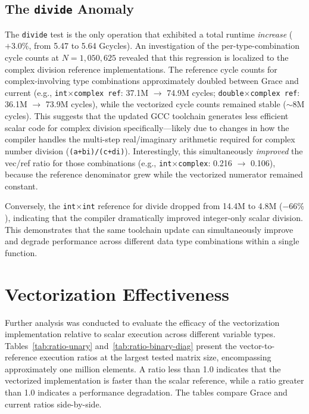 \subsection{The \texttt{divide} Anomaly}

The \texttt{divide} test is the only operation that exhibited a total runtime \emph{increase} ($+3.0\%$, from 5.47 to 5.64 Gcycles). An investigation of the per-type-combination cycle counts at $N = 1{,}050{,}625$ revealed that this regression is localized to the complex division reference implementations. The reference cycle counts for complex-involving type combinations approximately doubled between Grace and current (e.g., \texttt{int$\times$complex ref}: 37.1M $\rightarrow$ 74.9M cycles; \texttt{double$\times$complex ref}: 36.1M $\rightarrow$ 73.9M cycles), while the vectorized cycle counts remained stable ($\sim$8M cycles). This suggests that the updated GCC toolchain generates less efficient scalar code for complex division specifically---likely due to changes in how the compiler handles the multi-step real/imaginary arithmetic required for complex number division (\texttt{(a+bi)/(c+di)}). Interestingly, this simultaneously \emph{improved} the vec/ref ratio for those combinations (e.g., \texttt{int$\times$complex}: 0.216 $\rightarrow$ 0.106), because the reference denominator grew while the vectorized numerator remained constant.

Conversely, the \texttt{int$\times$int} reference for divide dropped from 14.4M to 4.8M ($-66\%$), indicating that the compiler dramatically improved integer-only scalar division. This demonstrates that the same toolchain update can simultaneously improve and degrade performance across different data type combinations within a single function.

\section{Vectorization Effectiveness}

Further analysis was conducted to evaluate the efficacy of the vectorization implementation relative to scalar execution across different variable types. Tables~\ref{tab:ratio-unary} and~\ref{tab:ratio-binary-diag} present the vector-to-reference execution ratios at the largest tested matrix size, encompassing approximately one million elements. A ratio less than 1.0 indicates that the vectorized implementation is faster than the scalar reference, while a ratio greater than 1.0 indicates a performance degradation. The tables compare Grace and current ratios side-by-side.

